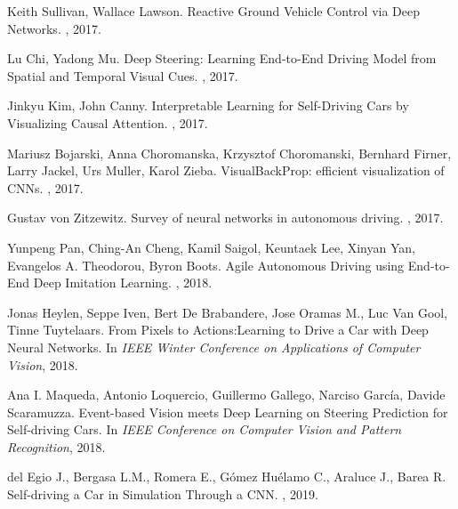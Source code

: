 \begin{thebibliography}{1}
Keith Sullivan, Wallace Lawson.
\newblock Reactive Ground Vehicle Control via Deep Networks.
, 2017.

Lu Chi, Yadong Mu.
\newblock Deep Steering: Learning End-to-End Driving Model from Spatial and Temporal Visual Cues.
, 2017.

Jinkyu Kim, John Canny.
\newblock Interpretable Learning for Self-Driving Cars by Visualizing Causal Attention.
, 2017.

Mariusz Bojarski, Anna Choromanska, Krzysztof Choromanski, Bernhard Firner, Larry Jackel, Urs Muller, Karol Zieba.
\newblock VisualBackProp: efficient visualization of CNNs.
, 2017.

Gustav von Zitzewitz.
\newblock Survey of neural networks in autonomous driving.
, 2017.

Yunpeng Pan, Ching-An Cheng, Kamil Saigol, Keuntaek Lee, Xinyan Yan, Evangelos A. Theodorou, Byron Boots.
\newblock Agile Autonomous Driving using End-to-End Deep Imitation Learning.
, 2018.

Jonas Heylen, Seppe Iven, Bert De Brabandere, Jose Oramas M., Luc Van Gool, Tinne Tuytelaars.
\newblock From Pixels to Actions:Learning to Drive a Car with Deep Neural Networks.
\newblock In {\em IEEE Winter Conference on Applications of Computer Vision}, 2018.

Ana I. Maqueda, Antonio Loquercio, Guillermo Gallego, Narciso García, Davide Scaramuzza.
\newblock Event-based Vision meets Deep Learning on Steering Prediction for Self-driving Cars.
\newblock In {\em  IEEE Conference on Computer Vision and Pattern Recognition}, 2018.

del Egio J., Bergasa L.M., Romera E., Gómez Huélamo C., Araluce J., Barea R.
\newblock Self-driving a Car in Simulation Through a CNN.
, 2019.


\end{thebibliography}
